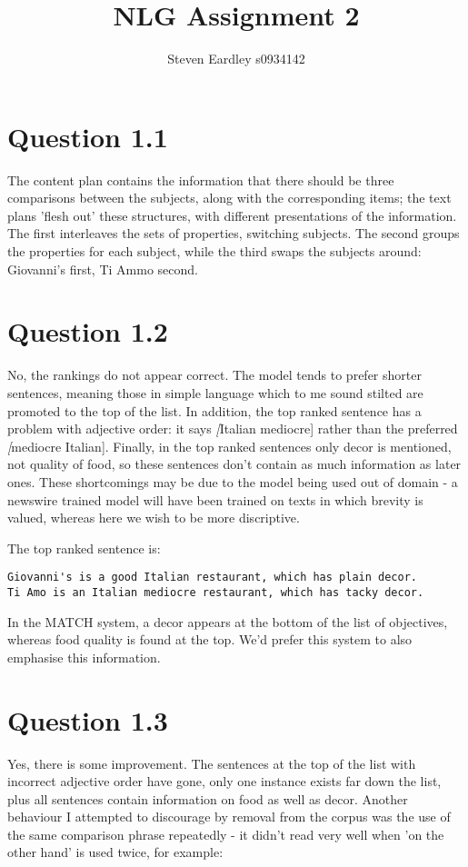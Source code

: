 \documentclass[a4paper,11pt,oneside]{article}
\begin{document}
\title{NLG Assignment 2}
\author{Steven Eardley s0934142}

\section{Question 1.1}
The content plan contains the information that there should be three comparisons between the subjects, along with the corresponding items; the text plans 'flesh out' these structures, with different presentations of the information. The first interleaves the sets of properties, switching subjects. The second groups the properties for each subject, while the third swaps the subjects around: Giovanni's first, Ti Ammo second.

\section{Question 1.2}
No, the rankings do not appear correct. The model tends to prefer shorter sentences, meaning those in simple language which to me sound stilted are promoted to the top of the list. In addition, the top ranked sentence has a problem with adjective order: it says \emph[Italian mediocre] rather than the preferred \emph[mediocre Italian]. Finally, in the top ranked sentences only decor is mentioned, not quality of food, so these sentences don't contain as much information as later ones. These shortcomings may be due to the model being used out of domain - a newswire trained model will have been trained on texts in which brevity is valued, whereas here we wish to be more discriptive.

The top ranked sentence is:
\begin{verbatim}
Giovanni's is a good Italian restaurant, which has plain decor. 
Ti Amo is an Italian mediocre restaurant, which has tacky decor. 
\end{verbatim}

In the MATCH system, a decor appears at the bottom of the list of objectives, whereas food quality is found at the top. We'd prefer this system to also emphasise this information.

\section{Question 1.3}
Yes, there is some improvement. The sentences at the top of the list with incorrect adjective order have gone, only one instance exists far down the list, plus all sentences contain information on food as well as decor.  Another behaviour I attempted to discourage by removal from the corpus was the use of the same comparison phrase repeatedly - it didn't read very well when 'on the other hand' is used twice, for example:
\end{document}

